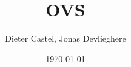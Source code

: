 \documentclass[11pt]{book}
\title{OVS}
\date{\today}
\author{Dieter Castel, Jonas Devlieghere}
\theoremstyle{definition}
\begin{document}
\frontmatter

\maketitle

\tableofcontents

\mainmatter







\appendix 



\nocite{*}
\end{document}
